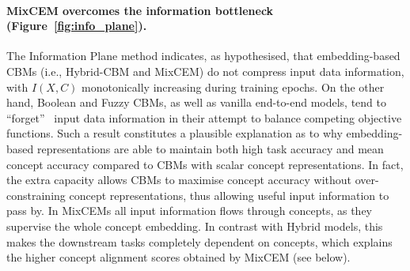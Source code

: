\documentclass[withindex,glossary]{cam-thesis}
\theoremstyle{plain}
\theoremstyle{definition}
\theoremstyle{remark}
\begin{document}
\paragraph{MixCEM overcomes the information bottleneck (Figure~\ref{fig:info_plane}).}
The Information Plane method indicates, as hypothesised, that embedding-based CBMs (i.e., Hybrid-CBM and MixCEM) do not compress input data information, with $I(X, C)$ monotonically increasing during training epochs. On the other hand, Boolean and Fuzzy CBMs, as well as vanilla end-to-end models, tend to ``forget''~\citep{shwartz2017opening} input data information in their attempt to balance competing objective functions. Such a result constitutes a plausible explanation as to why embedding-based representations are able to maintain both high task accuracy and mean concept accuracy compared to CBMs with scalar concept representations. In fact, the extra capacity allows CBMs to maximise concept accuracy without over-constraining concept representations, thus allowing useful input information to pass by. In MixCEMs all input information flows through concepts, as they supervise the whole concept embedding. In contrast with Hybrid models, this makes the downstream tasks completely dependent on concepts, which explains the higher concept alignment scores obtained by MixCEM (see below).
\end{document}
